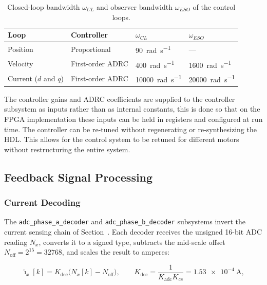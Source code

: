 \begin{table}[htbp]
	\centering
	\caption{Closed-loop bandwidth $\omega_{CL}$ and observer bandwidth $\omega_{ESO}$ of the control loops.}
	\vspace{4pt}
	\label{tab:loop_bandwidths}
	\begin{tabular}{llll}
		\hline
		Loop & Controller & $\omega_{CL}$ & $\omega_{ESO}$ \\
		\hline
		Position & Proportional & \SI{90}{\radian\per\second} & --- \\
		Velocity & First-order ADRC & \SI{400}{\radian\per\second} & \SI{1600}{\radian\per\second} \\
		Current ($d$ and $q$) & First-order ADRC & \SI{10000}{\radian\per\second} & \SI{20000}{\radian\per\second} \\
		\hline
	\end{tabular}
\end{table}

The controller gains and ADRC coefficients are supplied to the controller subsystem as inputs rather than as internal constants, this is done so that on the FPGA implementation these inputs can be held in registers and configured at run time. The controller can be re-tuned without regenerating or re-synthesizing the HDL. This allows for the control system to be retuned for different motors without restructuring the entire system. 

\subsection{Feedback Signal Processing}\label{sec:feedback}

\subsubsection{Current Decoding}

The \texttt{adc\_phase\_a\_decoder} and \texttt{adc\_phase\_b\_decoder} subsystems invert the current sensing chain of Section~. Each decoder receives the unsigned 16-bit ADC reading $N_x$, converts it to a signed type, subtracts the mid-scale offset $N_{\mathrm{off}} = 2^{15} = 32768$, and scales the result to amperes:


\begin{equation}
	\hat{\imath}_x[k] = K_{\mathrm{dec}} \Big( N_x[k] - N_{\mathrm{off}} \Big),
	\qquad
	K_{\mathrm{dec}} = \frac{1}{K_{\mathrm{adc}} K_{cs}}
	= \SI{1.53e-4}{\ampere},
	\label{eq:adc_decoder}
\end{equation}

